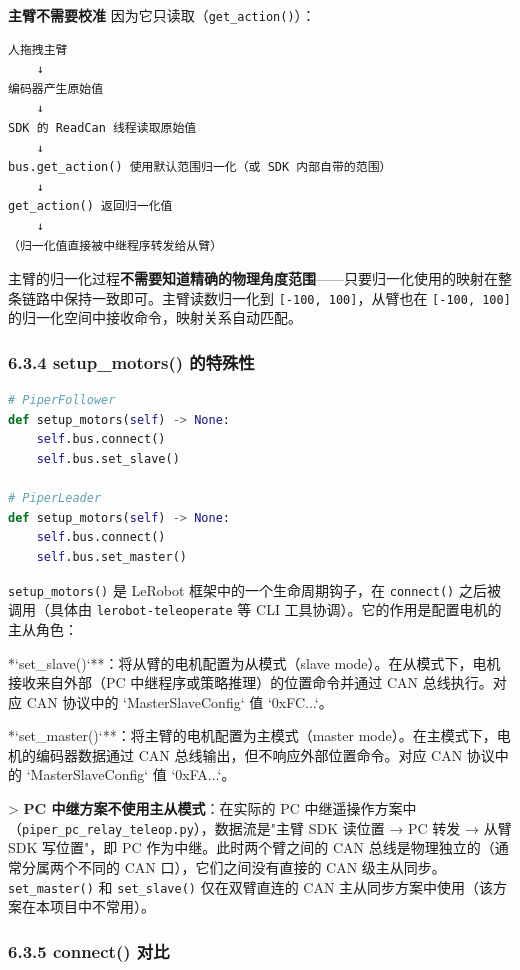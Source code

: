 \documentclass[UTF8,a4paper,11pt]{ctexart}
\begin{document}
{\textbf{主臂不需要校准} 因为它只读取（\texttt{get_action()}）：

\begin{lstlisting}[language=text]
人拖拽主臂
    ↓
编码器产生原始值
    ↓
SDK 的 ReadCan 线程读取原始值
    ↓
bus.get_action() 使用默认范围归一化（或 SDK 内部自带的范围）
    ↓
get_action() 返回归一化值
    ↓
（归一化值直接被中继程序转发给从臂）
\end{lstlisting}

主臂的归一化过程\textbf{不需要知道精确的物理角度范围}——只要归一化使用的映射在整条链路中保持一致即可。主臂读数归一化到 \texttt{[-100, 100]}，从臂也在 \texttt{[-100, 100]} 的归一化空间中接收命令，映射关系自动匹配。

\subsubsection{6.3.4 setup_motors() 的特殊性}

\begin{lstlisting}[language=python]
# PiperFollower
def setup_motors(self) -> None:
    self.bus.connect()
    self.bus.set_slave()

# PiperLeader
def setup_motors(self) -> None:
    self.bus.connect()
    self.bus.set_master()
\end{lstlisting}

\texttt{setup_motors()} 是 LeRobot 框架中的一个生命周期钩子，在 \texttt{connect()} 之后被调用（具体由 \texttt{lerobot-teleoperate} 等 CLI 工具协调）。它的作用是配置电机的主从角色：

\item **`set_slave()`**：将从臂的电机配置为从模式（slave mode）。在从模式下，电机接收来自外部（PC 中继程序或策略推理）的位置命令并通过 CAN 总线执行。对应 CAN 协议中的 `MasterSlaveConfig` 值 `0xFC...`。
\item **`set_master()`**：将主臂的电机配置为主模式（master mode）。在主模式下，电机的编码器数据通过 CAN 总线输出，但不响应外部位置命令。对应 CAN 协议中的 `MasterSlaveConfig` 值 `0xFA...`。

> \textbf{PC 中继方案不使用主从模式}：在实际的 PC 中继遥操作方案中（\texttt{piper_pc_relay_teleop.py}），数据流是"主臂 SDK 读位置 → PC 转发 → 从臂 SDK 写位置"，即 PC 作为中继。此时两个臂之间的 CAN 总线是物理独立的（通常分属两个不同的 CAN 口），它们之间没有直接的 CAN 级主从同步。\texttt{set_master()} 和 \texttt{set_slave()} 仅在双臂直连的 CAN 主从同步方案中使用（该方案在本项目中不常用）。

\subsubsection{6.3.5 connect() 对比}

}
\end{document}
